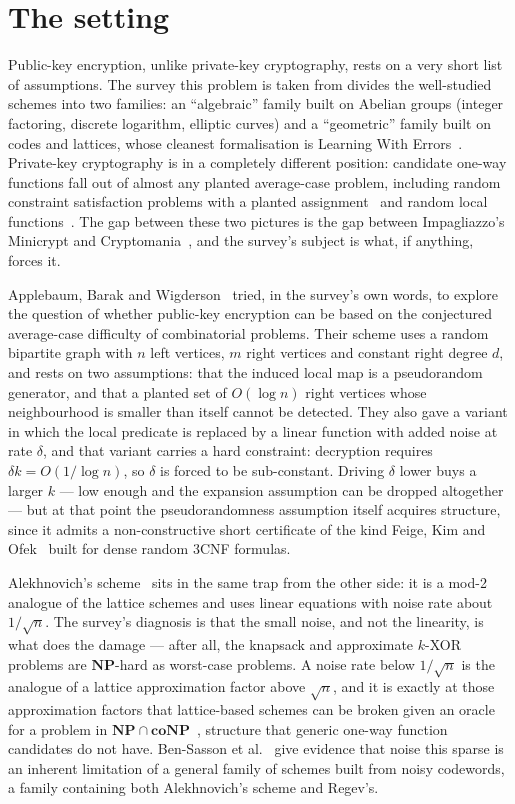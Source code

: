 \documentclass{aicr-conjecture}
\newcommand{\NP}{\mathbf{NP}}
\newcommand{\coNP}{\mathbf{coNP}}
\begin{document}
\section{The setting}\label{sec:setting}

Public-key encryption, unlike private-key cryptography, rests on a very
short list of assumptions. The survey this problem is taken from
divides the well-studied schemes into two families: an ``algebraic''
family built on Abelian groups (integer factoring, discrete logarithm,
elliptic curves) and a ``geometric'' family built on codes and
lattices, whose cleanest formalisation is Learning With
Errors~\cite{Reg09}. Private-key cryptography is in a completely
different position: candidate one-way functions fall out of almost any
planted average-case problem, including random constraint satisfaction
problems with a planted assignment~\cite{BKS13} and random local
functions~\cite{Gol11,App15}. The gap between these two pictures is the
gap between Impagliazzo's Minicrypt and Cryptomania~\cite{Imp95}, and
the survey's subject is what, if anything, forces it.

Applebaum, Barak and Wigderson~\cite{ABW10} tried, in the survey's own
words, to explore the question of whether public-key encryption can be
based on the conjectured average-case difficulty of combinatorial
problems. Their scheme uses a random bipartite graph with $n$ left
vertices, $m$ right vertices and constant right degree $d$, and rests
on two assumptions: that the induced local map is a pseudorandom
generator, and that a planted set of $O(\log n)$ right vertices whose
neighbourhood is smaller than itself cannot be detected. They also gave
a variant in which the local predicate is replaced by a linear function
with added noise at rate $\delta$, and that variant carries a hard
constraint: decryption requires $\delta k = O(1/\log n)$, so $\delta$
is forced to be sub-constant. Driving $\delta$ lower buys a larger $k$
--- low enough and the expansion assumption can be dropped altogether
--- but at that point the pseudorandomness assumption itself acquires
structure, since it admits a non-constructive short certificate of the
kind Feige, Kim and Ofek~\cite{FKO06} built for dense random 3CNF
formulas.

Alekhnovich's scheme~\cite{Ale11} sits in the same trap from the other
side: it is a mod-2 analogue of the lattice schemes and uses linear
equations with noise rate about $1/\sqrt{n}$. The survey's diagnosis is
that the small noise, and not the linearity, is what does the damage
--- after all, the knapsack and approximate $k$-XOR problems are
$\NP$-hard as worst-case problems. A noise rate below $1/\sqrt{n}$ is
the analogue of a lattice approximation factor above $\sqrt{n}$, and it
is exactly at those approximation factors that lattice-based schemes
can be broken given an oracle for a problem in $\NP \cap
\coNP$~\cite{AR05}, structure that generic one-way function candidates
do not have. Ben-Sasson et al.~\cite{BBD16} give evidence that noise
this sparse is an inherent limitation of a general family of schemes
built from noisy codewords, a family containing both Alekhnovich's
scheme and Regev's.
\end{document}
